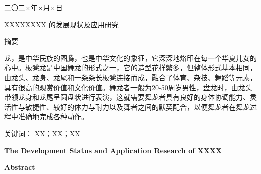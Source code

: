 \documentclass[12pt, a4paper]{article}
\begin{document}
\vspace{1cm}

\vspace{1cm}
\begin{center}
    { \heiti 二〇二×年×月×日}
\end{center}

\newpage %
\pagestyle{fancy} %
\fancyhf{} %
\renewcommand{\headrulewidth}{0pt} %
\renewcommand{\footrulewidth}{0pt} %

\begin{center}
    {\heiti XXXXXXXX 的发展现状及应用研究}
\end{center}

\vspace{1.5cm}

\noindent %
{\heiti{}摘要}

\vspace{0.5\baselineskip} %
\begin{spacing}{1.25} %
\songti{} %
龙，是中华民族的图腾，也是中华文化的象征，它深深地烙印在每一个华夏儿女的心中。板凳龙是中国舞龙的形式之一，它的造型花样繁多，但整体形式基本相同，由龙头、龙身、龙尾和一条条长板凳连接而成，融合了体育、杂技、舞蹈等元素，具有很高的观赏价值和文化价值。舞龙者一般为20-50周岁男性，盘龙时，由龙头带领龙身和龙尾呈圆盘状进行表演，这就需要舞龙者具有良好的身体协调能力、灵活性与敏捷性、较好的体力与耐力以及舞者之间的默契配合，以便舞龙者在舞龙过程中准确地完成各种动作。
\end{spacing}

\vspace{0.5\baselineskip} %

\noindent %
{\heiti{}关键词：}{\songti{} XX；XX；XX}

\newpage    
\begin{center}
    { \textbf{The Development Status and Application Research of XXXX}}
\end{center}

\vspace{1.5cm}

\noindent %
{\textbf{Abstract}}
\end{document}
